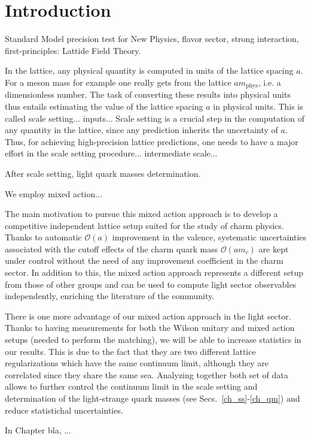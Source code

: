 \chapter*{Introduction}


\label{ch_introduction}


Standard Model precision test for New Physics, flavor sector, strong interaction, first-principles: Lattide Field Theory.

In the lattice, any physical quantity is computed in units of the lattice spacing $a$. For a meson mass for example one really gets from the lattice $am_{\textrm{phys}}$, i.e. a dimensionless number. The task of converting these results into physical units thus entails estimating the value of the lattice spacing $a$ in physical units. This is called scale setting... inputs... Scale setting is a crucial step in the computation of any quantity in the lattice, since any prediction inherits the uncertainty of $a$. Thus, for achieving high-precision lattice predictions, one needs to have a major effort in the scale setting procedure... intermediate scale...

After scale setting, light quark masses determination.

We employ mixed action...

The main motivation to pursue this mixed action approach is to develop a competitive independent lattice setup suited for the study of charm physics. Thanks to automatic $\mathcal{O}(a)$ improvement in the valence, systematic uncertainties associated with the cutoff effects of the charm quark mass $\mathcal{O}(am_c)$ are kept under control without the need of any improvement coefficient in the charm sector. In addition to this, the mixed action approach represents a different setup from those of other groups and can be used to compute light sector observables independently, enriching the literature of the community.

There is one more advantage of our mixed action approach in the light sector. Thanks to having measurements for both the Wilson unitary and mixed action setups (needed to perform the matching), we will be able to increase statistics in our results. This is due to the fact that they are two different lattice regularizations which have the same continuum limit, although they are correlated since they share the same sea. Analyzing together both set of data allows to further control the continuum limit in the scale setting and determination of the light-strange quark masses (see Secs.~\ref{ch_ss}-\ref{ch_qm}) and reduce statistichal uncertainties.

In Chapter bla, ...
